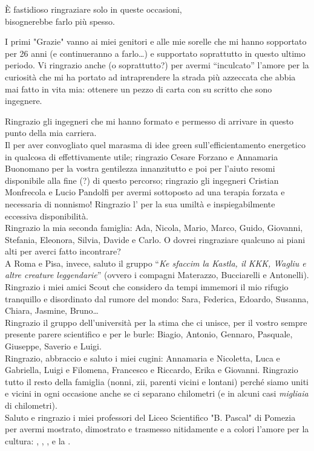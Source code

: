 \thispagestyle{empty}
\begin{flushright}
\Large\textsf{È fastidioso ringraziare solo in queste occasioni,\\bisognerebbe farlo più spesso.}	
\end{flushright}

I primi "Grazie" vanno ai miei genitori e alle mie sorelle che mi hanno sopportato per 26 anni (e continueranno a farlo\dots) e supportato soprattutto in questo ultimo periodo. Vi ringrazio anche (o soprattutto?) per avermi ``inculcato'' l'amore per la curiosità che mi ha portato ad intraprendere la strada più azzeccata che abbia mai fatto in vita mia: ottenere un pezzo di carta con su scritto che sono ingegnere.

Ringrazio gli ingegneri che mi hanno formato e permesso di arrivare in questo punto della mia carriera.\\
Il  per aver convogliato quel marasma di idee green sull'efficientamento energetico in qualcosa di effettivamente utile;
ringrazio Cesare Forzano e Annamaria Buonomano per la vostra gentilezza innanzitutto e poi per l'aiuto resomi disponibile alla fine (?) di questo percorso;
ringrazio gli ingegneri Cristian Monfrecola e Lucio Pandolfi per avermi sottoposto ad una terapia forzata e necessaria di nonnismo!
Ringrazio l' per la sua umiltà e inspiegabilmente eccessiva disponibilità.\\
Ringrazio la mia seconda famiglia: Ada, Nicola, Mario, Marco, Guido, Giovanni, Stefania, Eleonora, Silvia, Davide e Carlo. O dovrei ringraziare qualcuno ai piani alti per averci fatto incontrare?\\
A Roma e Pisa, invece, saluto il gruppo ``\emph{Ke sfaccim la Kastla, il KKK, Wagliu e altre creature leggendarie}'' (ovvero i compagni Materazzo, Bucciarelli e Antonelli). \\
Ringrazio i miei amici Scout che considero da tempi immemori il mio rifugio tranquillo e disordinato dal rumore del mondo: Sara, Federica, Edoardo, Susanna, Chiara, Jasmine, Bruno\dots\\
Ringrazio il gruppo dell'università per la stima che ci unisce, per il vostro sempre presente parere scientifico e per le burle: Biagio, Antonio, Gennaro, Pasquale, Giuseppe, Saverio e Luigi. \\
Ringrazio, abbraccio e saluto i miei cugini: Annamaria e Nicoletta, Luca e Gabriella, Luigi e Filomena, Francesco e Riccardo, Erika e Giovanni. Ringrazio tutto il resto della famiglia (nonni, zii, parenti vicini e lontani) perché siamo uniti e vicini in ogni occasione anche se ci separano chilometri (e in alcuni casi \emph{migliaia} di chilometri).\\
Saluto e ringrazio i miei professori del Liceo Scientifico "B. Pascal" di Pomezia per avermi mostrato, dimostrato e trasmesso nitidamente e a colori l'amore per la cultura: , , ,  e la .

